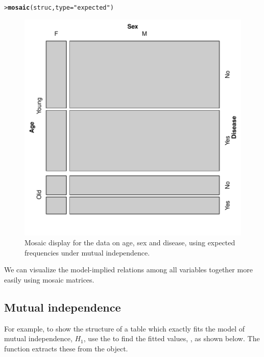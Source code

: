 \documentclass[10pt,krantz2]{krantz}\usepackage[]{graphicx}\usepackage[]{color}
\makeatletter
\newcommand{\hlstr}[1]{\textcolor[rgb]{0.192,0.494,0.8}{#1}}%
\newcommand{\hlstd}[1]{\textcolor[rgb]{0.345,0.345,0.345}{#1}}%
\newcommand{\hlkwc}[1]{\textcolor[rgb]{0.333,0.667,0.333}{#1}}%
\newcommand{\hlkwd}[1]{\textcolor[rgb]{0.737,0.353,0.396}{\textbf{#1}}}%
\newenvironment{kframe}{%
 \def\at@end@of@kframe{}%
 \ifinner\ifhmode%
  \def\at@end@of@kframe{\end{minipage}}%
  \begin{minipage}{\columnwidth}%
 \fi\fi%
 \def\FrameCommand##1{\hskip\@totalleftmargin \hskip-\fboxsep
 \colorbox{shadecolor}{##1}\hskip-\fboxsep
     \hskip-\linewidth \hskip-\@totalleftmargin \hskip\columnwidth}%
 \MakeFramed {\advance\hsize-\width
   \@totalleftmargin\z@ \linewidth\hsize
   \@setminipage}}%
 {\par\unskip\endMakeFramed%
 \at@end@of@kframe}
\newenvironment{knitrout}{}{} %
\renewenvironment{knitrout}{\small\renewcommand{\baselinestretch}{.85}}{} %
\makeatother
\begin{document}
\begin{knitrout}
\color{fgcolor}\begin{kframe}
\begin{alltt}
\hlstd{> }\hlkwd{mosaic}\hlstd{(struc,} \hlkwc{type} \hlstd{=} \hlstr{"expected"}\hlstd{)}
\end{alltt}
\end{kframe}\begin{figure}[!htbp]

\centerline{\includegraphics[width=.5\textwidth]{ch05/fig/struc-mos2-1} }

\caption[Mosaic display for the data on age, sex and disease, using expected frequencies under mutual independence]{Mosaic display for the data on age, sex and disease, using expected frequencies under mutual independence.\label{fig:struc-mos2}}
\end{figure}


\end{knitrout}
We can visualize the model-implied relations among all variables together more easily
using mosaic matrices.

\subsection{Mutual independence}
For example, to show the structure of a table which exactly fits the model of
mutual independence, $H_1$, use the  to find the
fitted values, , as shown below.  The
function  extracts these from the  object.
\end{document}
